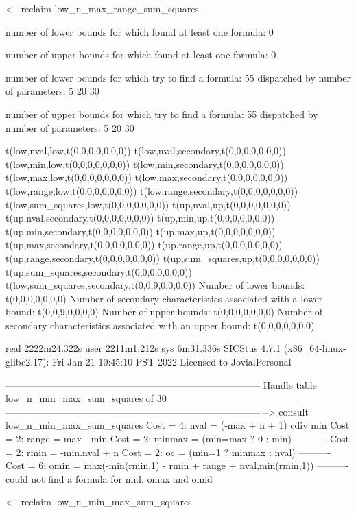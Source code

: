 <-- reclaim low_n_max_range_sum_squares

number of lower bounds for which found at least one formula: 0

number of upper bounds for which found at least one formula: 0

number of lower bounds for which try to find a formula: 55
dispatched by number of parameters: 5  20  30

number of upper bounds for which try to find a formula: 55
dispatched by number of parameters: 5  20  30

t(low,nval,low,t(0,0,0,0,0,0,0))
t(low,nval,secondary,t(0,0,0,0,0,0,0))
t(low,min,low,t(0,0,0,0,0,0,0))
t(low,min,secondary,t(0,0,0,0,0,0,0))
t(low,max,low,t(0,0,0,0,0,0,0))
t(low,max,secondary,t(0,0,0,0,0,0,0))
t(low,range,low,t(0,0,0,0,0,0,0))
t(low,range,secondary,t(0,0,0,0,0,0,0))
t(low,sum_squares,low,t(0,0,0,0,0,0,0))
t(up,nval,up,t(0,0,0,0,0,0,0))
t(up,nval,secondary,t(0,0,0,0,0,0,0))
t(up,min,up,t(0,0,0,0,0,0,0))
t(up,min,secondary,t(0,0,0,0,0,0,0))
t(up,max,up,t(0,0,0,0,0,0,0))
t(up,max,secondary,t(0,0,0,0,0,0,0))
t(up,range,up,t(0,0,0,0,0,0,0))
t(up,range,secondary,t(0,0,0,0,0,0,0))
t(up,sum_squares,up,t(0,0,0,0,0,0,0))
t(up,sum_squares,secondary,t(0,0,0,0,0,0,0))
t(low,sum_squares,secondary,t(0,0,9,0,0,0,0))
Number of lower bounds:                                             t(0,0,0,0,0,0,0)
Number of secondary characteristics associated with a lower bound:  t(0,0,9,0,0,0,0)
Number of upper bounds:                                             t(0,0,0,0,0,0,0)
Number of secondary characteristics associated with an upper bound: t(0,0,0,0,0,0,0)

real	2222m24.322s
user	2211m1.212s
sys	6m31.336s
SICStus 4.7.1 (x86_64-linux-glibc2.17): Fri Jan 21 10:45:10 PST 2022
Licensed to JovialPersonal


--------------------------------------------------------------------------------
Handle table low_n_min_max_sum_squares of 30
--------------------------------------------------------------------------------
--> consult low_n_min_max_sum_squares
Cost =  4:  nval   = (-max + n + 1) cdiv min %
Cost =  2:  range  = max - min
Cost =  2:  minmax = (min=max ? 0 : min)
----------
Cost =  2:  rmin   = -min.nval + n
Cost =  2:  oc     = (min=1 ? minmax : nval)
----------
Cost =  6:  omin   = max(-min(rmin,1) - rmin + range + nval,min(rmin,1))
----------
could not find a formula for mid, omax and omid

<-- reclaim low_n_min_max_sum_squares

